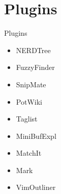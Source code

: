\section{Plugins}
\begin{frame}{Plugins}
\begin{itemize}
	\item NERDTree
	\item FuzzyFinder
	\item SnipMate
	\item PotWiki
	\item Taglist
	\item MiniBufExpl
	\item MatchIt %
	\item Mark %
	\item VimOutliner
\end{itemize}
\end{frame}
